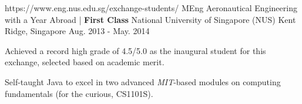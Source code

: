\begin{cventries}
  \cventry
    {https://www.eng.nus.edu.sg/exchange-students/}
    {MEng Aeronautical Engineering with a Year Abroad | \textbf{First Class}} %
    {National University of Singapore (NUS)} %
    {Kent Ridge, Singapore} %
    {Aug. 2013 - May. 2014} %
    {
      \begin{cvitems} %
        \item {Achieved a record high grade of 4.5/5.0 as the inaugural student for this exchange, selected based on academic merit.}
        \item {Self-taught Java to excel in two advanced \emph{MIT}-based modules on computing fundamentals (for the curious, CS1101S).}
      \end{cvitems}
    }
    
\end{cventries}